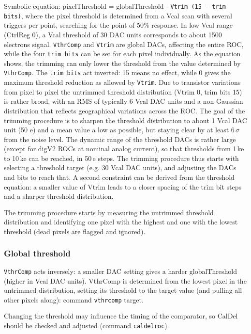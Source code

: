 \documentclass[english]{article}
\begin{document}
Symbolic equation: pixelThreshold = globalThreshold - \texttt{Vtrim\,(15\,-\,trim
bits)}, where the pixel threshold is determined from a Vcal scan with
several triggers per point, searching for the point of 50\% response.
In low Vcal range (CtrlReg 0), a Vcal threshold of 30 DAC units corresponds
to about 1500 electrons signal. \texttt{VthrComp} and \texttt{Vtrim}
are global DACs, affecting the entire ROC, while the four \texttt{trim
bits} can be set for each pixel individually. As the equation shows,
the trimming can only lower the threshold from the value determined
by \texttt{VthrComp}. The \texttt{trim bits} act inverted: 15 means
no effect, while 0 gives the maximum threshold reduction as allowed
by \texttt{Vtrim}. Due to transistor variations from pixel to pixel
the untrimmed threshold distribution (Vtrim 0, trim bits 15) is rather
broad, with an RMS of typically 6 Vcal DAC units and a non-Gaussian
distribution that reflects geographical variations across the ROC.
The goal of the trimming procedure is to sharpen the threshold distribution
to about 1 Vcal DAC unit (50 e) and a mean value a low as possible,
but staying clear by at least 6\,$\sigma$ from the noise level.
The dynamic range of the threshold DACs is rather large (except for
digV2 ROCs at nominal analog current), so that thresholds from 1\,ke
to 10\,ke can be reached, in 50\,e steps. The trimming procedure
thus starts with selecting a threshold target (e.g. 30 Vcal DAC units),
and adjusting the DACs and bits to reach that. A second constraint
can be derived from the threshold equation: a smaller value of Vtrim
leads to a closer spacing of the trim bit steps and a sharper threshold
distribution.

The trimming procedure starts by measuring the untrimmed threshold
distribution and identifying one pixel with the highest and one with
the lowest threshold (dead pixels are flagged and ignored).


\subsubsection{Global threshold}

\texttt{VthrComp} acts inversely: a smaller DAC setting gives a harder
globalThreshold (higher in Vcal DAC units). VthrComp is determined
from the lowest pixel in the untrimmed distribution, setting its threshold
to the target value (and pulling all other pixels along): command
\texttt{vthrcomp} target.

Changing the threshold may influence the timing of the comparator,
so CalDel should be checked and adjusted (command \texttt{caldelroc}).
\end{document}
